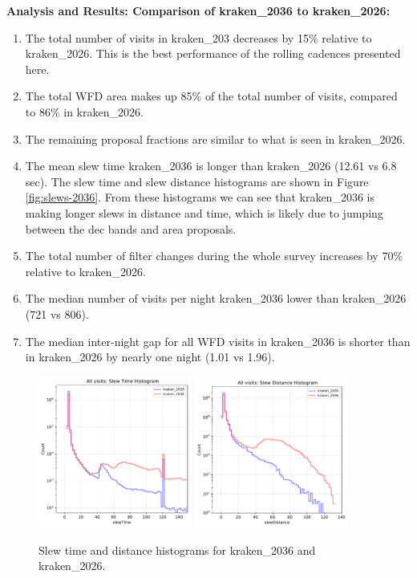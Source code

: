 \documentclass[DM,lsstdraft,authoryear,toc]{lsstdoc}
\begin{document}
\textbf{Analysis and Results: Comparison of kraken\_2036 to kraken\_2026:}

\begin{enumerate}
\item The total number of visits in kraken\_203 decreases by 15$\%$ relative to kraken\_2026. This is the best performance
of the rolling cadences presented here.
\item The total WFD area makes up 85$\%$ of the total number of visits, compared to 86$\%$ in kraken\_2026.
\item The remaining proposal fractions are similar to what is seen in kraken\_2026.
\item The mean slew time kraken\_2036 is longer than kraken\_2026 (12.61 vs 6.8 sec). The slew time and slew distance
histograms are shown in Figure \autoref{fig:slews-2036}. From these histograms we can see that kraken\_2036 is making longer
slews in distance and time, which is likely due to jumping between the dec bands and area proposals.
\item The total number of filter changes during the whole survey increases by 70$\%$ relative to kraken\_2026.
\item The median number of visits per night kraken\_2036 lower than kraken\_2026 (721 vs 806). 
\item The median inter-night gap for all WFD visits in kraken\_2036 is shorter than in kraken\_2026 by nearly one night (1.01 vs 1.96).
\end{enumerate}


\begin{figure}[ht]
\centering
\includegraphics[width=0.45\textwidth]{figures/kraken_2026_kraken_2036_Slew_Time_Histogram_All_visits_ONED_ComboBinnedData.pdf}
\includegraphics[width=0.45\textwidth]{figures/kraken_2026_kraken_2036_Slew_Distance_Histogram_All_visits_ONED_ComboBinnedData.pdf} 
\caption{Slew time and distance histograms for kraken\_2036 and  kraken\_2026.}
\label{fig:slews-2036}
\end{figure}
\end{document}
